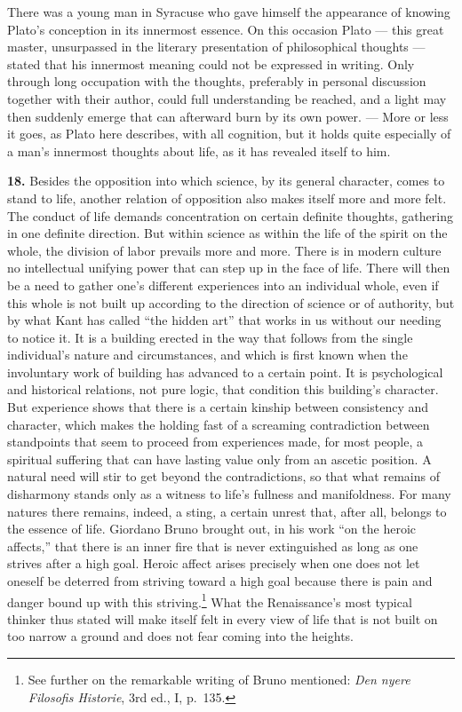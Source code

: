 \documentclass[12pt]{book}
\newcommand{\hnum}[1]{\textbf{#1.}\enspace}
\newcommand{\opage}[1]{\marginnote{\footnotesize\textit{[#1]}}}
\begin{document}
There was a young man in Syracuse who gave himself the appearance of knowing Plato's conception in its
innermost essence. On this occasion Plato --- this great master, unsurpassed in the literary presentation
of philosophical thoughts --- stated that his innermost meaning could not be expressed in writing. Only
through long occupation with the thoughts, preferably in personal discussion together with their author,
could full \opage{54}understanding be reached, and a light may then suddenly emerge that can afterward burn by its
own power. --- More or less it goes, as Plato here describes, with all cognition, but it holds quite
especially of a man's innermost thoughts about life, as it has revealed itself to him.

\hnum{18} Besides the opposition into which science, by its general character, comes to stand to life,
another relation of opposition also makes itself more and more felt. The conduct of life demands
concentration on certain definite thoughts, gathering in one definite direction. But within science as
within the life of the spirit on the whole, the division of labor prevails more and more. There is in modern
culture no intellectual unifying power that can step up in the face of life. There will then be a need to
gather one's different experiences into an individual whole, even if this whole is not built up according
to the direction of science or of authority, but by what Kant has called ``the hidden art'' that works in
us without our needing to notice it. It is a building erected in the way that follows from the single
individual's nature and circumstances, and which is first known when the involuntary work of building has
advanced to a certain point. It is psychological and historical relations, not pure logic, that condition
this building's character. But experience shows that there is a certain kinship between consistency and
character, which makes the holding fast of a screaming contradiction between standpoints that seem to
proceed from experiences made, for most people, a spiritual suffering that can have lasting value only
from an ascetic position. A natural need will stir to get beyond the contradictions, so that what remains
of disharmony stands only as a witness to life's \opage{55}fullness and manifoldness. For many natures there
remains, indeed, a sting, a certain unrest that, after all, belongs to the essence of life. Giordano
Bruno brought out, in his work ``on the heroic affects,'' that there is an inner fire that is never
extinguished as long as one strives after a high goal. Heroic affect arises precisely when one does not
let oneself be deterred from striving toward a high goal because there is pain and danger bound up with
this striving.\footnote{See further on the remarkable writing of Bruno mentioned: \textit{Den nyere
Filosofis Historie}, 3rd ed., I, p.\ 135.} What the Renaissance's most typical thinker thus stated will
make itself felt in every view of life that is not built on too narrow a ground and does not fear coming
into the heights.
\end{document}
